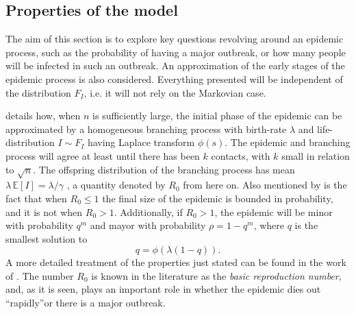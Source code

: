 \documentclass[aap]{imsart}
\newcommand\expec[1]{\, \mathbb{E} \left\lbrack #1 \right\rbrack}
\theoremstyle{remark}
\begin{document}
\subsection{Properties of the model}\label{subs:properties}
The aim of this section is to explore key questions revolving around an epidemic process, such as the probability of having a major outbreak, or how many people will be infected in such an outbreak. An approximation of the early stages of the epidemic process is also considered. Everything presented will be independent of the distribution $F_I$, i.e. it will not rely on the Markovian case.

\citet{Britton_2010} details how, when $n$ is sufficiently large, the initial phase of the epidemic can be approximated by a homogeneous branching process with birth-rate $\lambda$ and life-distribution $I \sim F_I$ \citep{lawler_2006} having Laplace transform $\phi(s)$. The epidemic and branching process will agree at least until there has been $k$ contacts, with $k$ small in relation to $\sqrt{n}$. The offspring distribution of the branching process has mean $\lambda \expec{I} = \lambda/\gamma$  \citep{Britton_2010}, a quantity denoted by $R_0$ from here on. Also mentioned by \citet{Britton_2010} is the fact that when $R_0 \leq 1$ the final size of the epidemic is bounded in probability, and it is not when $R_0 > 1$. Additionally, if $R_0 > 1$, the epidemic will be minor with probability $q^m$ and mayor with probability $\rho = 1-q^m$, where $q$ is the smallest solution to 
\begin{equation}\label{eq:q}
	q = \phi(\lambda (1-q)).
\end{equation}
A more detailed treatment of the properties just stated can be found in the work of \citet{Ball_1983}. The number $R_0$ is known in the literature as the \textit{basic reproduction number}, and, as it is seen, plays an important role in whether the epidemic dies out \textquotedblleft rapidly\textquotedblright or there is a major outbreak.
\end{document}
